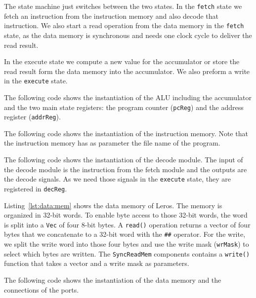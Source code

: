 \documentclass[%
    10pt,
    headinclude, footexclude,
    openright, %
    notitlepage,
    cleardoubleempty,
    headsepline,
    pointlessnumbers,
    bibtotoc, idxtotoc,
    ]{scrbook}
\newcommand{\code}[1]{{\small{\texttt{#1}}}}
\begin{document}



\noindent The state machine just switches between the two states.
In the \code{fetch} state we fetch an instruction from the instruction
memory and also decode that instruction. We also start a read operation
from the data memory in the \code{fetch} state, as the data memory
is synchronous and needs one clock cycle to deliver the read result.

In the execute state we compute a new value for the accumulator
or store the read result form the data memory into the accumulator.
We also preform a write in the \code{execute} state.

The following code shows the instantiation of the ALU including the
accumulator and the two main state registers: the program counter (\code{pcReg})
and the address register (\code{addrReg}).


The following code shows the instantiation of the instruction memory.
Note that the instruction memory has as parameter the file name
of the program.


The following code shows the instantiation of the decode module.
The input of the decode module is the instruction from the fetch
module and the outputs are the decode signals. As we need those signals
in the \code{execute} state, they are registered in \code{decReg}.




Listing~\ref{lst:data:mem} shows the data memory of Leros.
The memory is organized in 32-bit words. To enable byte access to those
32-bit words, the word is split into a \code{Vec} of four 8-bit bytes.
A \code{read()} operation returns a vector of four bytes that we
concatenate to a 32-bit word with the \code{\#\#} operator.
For the write, we split the write word into those four bytes and
use the write mask (\code{wrMask}) to select which bytes are written.
The \code{SyncReadMem} components contains a \code{write()} function
that takes a vector and a write mask as parameters.


The following code shows the instantiation of the data memory and the connections
of the ports. 

\end{document}

